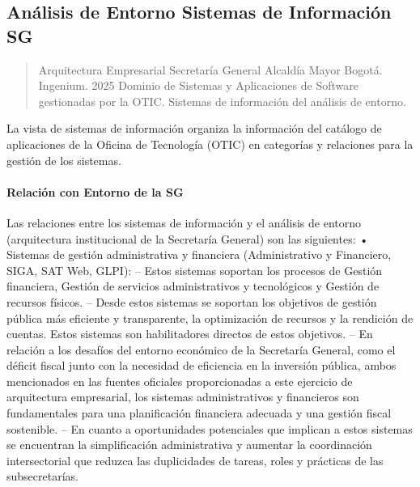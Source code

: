 \documentclass[
	a4paper, %
	12pt, %
]{include/CSSullivanBusinessReport}
\begin{document}
\subsection{Análisis de Entorno Sistemas de Información
SG}\label{sec:anuxe1lisis-de-entorno-sistemas-de-informaciuxf3n-sg}

\begin{quote}
Arquitectura Empresarial Secretaría General Alcaldía Mayor Bogotá.
Ingenium. 2025 Dominio de Sistemas y Aplicaciones de Software
gestionadas por la OTIC. Sistemas de información del análisis de
entorno.
\end{quote}

La vista de sistemas de información organiza la información del catálogo
de aplicaciones de la Oficina de Tecnología (OTIC) en categorías y
relaciones para la gestión de los sistemas.

\paragraph{Relación con Entorno de la
SG}\label{sec:relaciuxf3n-con-entorno-de-la-sg}

Las relaciones entre los sistemas de información y el análisis de
entorno (arquitectura institucional de la Secretaría General) son las
siguientes: • Sistemas de gestión administrativa y financiera
(Administrativo y Financiero, SIGA, SAT Web, GLPI): -- Estos sistemas
soportan los procesos de Gestión financiera, Gestión de servicios
administrativos y tecnológicos y Gestión de recursos físicos. -- Desde
estos sistemas se soportan los objetivos de gestión pública más
eficiente y transparente, la optimización de recursos y la rendición de
cuentas. Estos sistemas son habilitadores directos de estos objetivos.
-- En relación a los desafíos del entorno económico de la Secretaría
General, como el déficit fiscal junto con la necesidad de eficiencia en
la inversión pública, ambos mencionados en las fuentes oficiales
proporcionadas a este ejercicio de arquitectura empresarial, los
sistemas administrativos y financieros son fundamentales para una
planificación financiera adecuada y una gestión fiscal sostenible. -- En
cuanto a oportunidades potenciales que implican a estos sistemas se
encuentran la simplificación administrativa y aumentar la coordinación
intersectorial que reduzca las duplicidades de tareas, roles y prácticas
de las subsecretarías.
\end{document}
